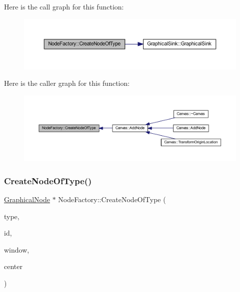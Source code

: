 Here is the call graph for this function\+:
\nopagebreak
\begin{figure}[H]
\begin{center}
\leavevmode
\includegraphics[width=350pt]{class_node_factory_ae55ad09e7b24522328a979fce9ac5e2a_cgraph}
\end{center}
\end{figure}
Here is the caller graph for this function\+:
\nopagebreak
\begin{figure}[H]
\begin{center}
\leavevmode
\includegraphics[width=350pt]{class_node_factory_ae55ad09e7b24522328a979fce9ac5e2a_icgraph}
\end{center}
\end{figure}
\mbox{\label{class_node_factory_a152f41696a5206529e5c2981fefcdf55}} 
\subsubsection{\texorpdfstring{Create\+Node\+Of\+Type()}{CreateNodeOfType()}\hspace{0.1cm}{\footnotesize\ttfamily [2/2]}}
{\footnotesize\ttfamily \hyperlink{class_graphical_node}{Graphical\+Node} $\ast$ Node\+Factory\+::\+Create\+Node\+Of\+Type (\begin{DoxyParamCaption}\item[{\hyperlink{class_generic_node_a9e7985ab9bbfa1c85091adc0ab71a6b6}{Generic\+Node\+::\+Type}}]{type,  }\item[{\hyperlink{_graphical_element_8h_ade5fd6c85839a416577ff9de1605141e}{Element\+Key}}]{id,  }\item[{wx\+Window $\ast$}]{window,  }\item[{wx\+Point2\+D\+Double}]{center }\end{DoxyParamCaption})\hspace{0.3cm}{\ttfamily [static]}}



